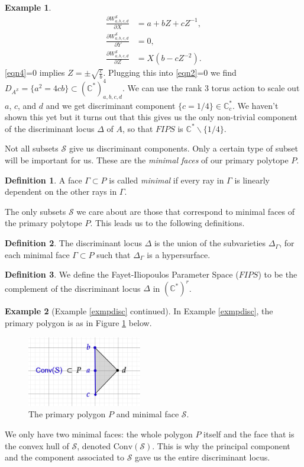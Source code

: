 \documentclass[oneside]{amsart}
\theoremstyle{definition}
\newtheorem{definition}{Definition}[section]
\theoremstyle{definition}
\theoremstyle{definition}
\newtheorem{example}{Example} [section]
\theoremstyle{definition}
\newcommand{\CC}{\mathbb{C}}
\begin{document}
\begin{example}
\begin{align}
        \label{eqn2}
        \frac{\partial W_{a,b,c,d}^{\mathcal{S}}}{\partial X} &= a + bZ +cZ^{-1}, \\
        \frac{\partial W_{a,b,c,d}^{\mathcal{S}}}{\partial Y} &=0, \\
        \label{eqn4}
        \frac{\partial W_{a,b,c,d}^{\mathcal{S}}}{\partial Z} &= X(b - cZ^{-2}).
    \end{align}
    \eqref{eqn4}=0 implies $Z = \pm \sqrt{\frac{c}{b}}$. Plugging this into \eqref{eqn2}=0 we find $D_{A^{\mathcal{S}}} = \{a^2 = 4 cb \}\subset (\CC^*)^{4}_{a,b,c,d}$. We can use the rank 3 torus action to scale out $a$, $c$, and $d$ and we get discriminant component $\{c=1/4 \} \in \CC^*_c$. We haven't shown this yet but it turns out that this gives us the only non-trivial component of the discriminant locus $\Delta$ of $A$, so that $FIPS$ is $\CC^* \backslash \{ 1/4 \} $.
\end{example}
Not all subsets $\mathcal{S}$ give us discriminant components. Only a certain type of subset will be important for us. These are the \textit{minimal faces} of our primary polytope $P$. 
\begin{definition}
    A face $\Gamma \subset P $ is called \textit{minimal} if every ray in $\Gamma$ is linearly dependent on the other rays in $\Gamma$.
\end{definition}
The only subsets $\mathcal{S}$ we care about are those that correspond to minimal faces of the primary polytope $P$. This leads us to the following definitions.
\begin{definition}
    The discriminant locus $\Delta$ is the union of the subvarieties $\Delta_{\Gamma}$, for each minimal face $\Gamma \subset P$ such that $\Delta_{\Gamma}$ is a hypersurface.
\end{definition}
\begin{definition}
    \label{FIPS}
    We define the Fayet-Iliopoulos Parameter Space ($FIPS$) to be the complement of the discriminant locus $\Delta$ in $(\CC^*)^r$.
\end{definition}
\begin{example} [Example \ref{exmpdisc} continued]
    In Example \ref{exmpdisc}, the primary polygon is as in Figure \ref{gkzcomponents} below.
    \begin{figure}[!h]
        \centering
        \includegraphics[width=5cm]{face&subspace/primary.png}
        \caption{The primary polygon $P$ and minimal face $\mathcal{S}$.}
        \label{gkzcomponents}
    \end{figure}
    We only have two minimal faces: the whole polygon $P$ itself and the face that is the convex hull of $\mathcal{S}$, denoted $\text{Conv}(\mathcal{S})$. This is why the principal component and the component associated to $\mathcal{S}$ gave us the entire discriminant locus.
\end{example} 
\end{document}
